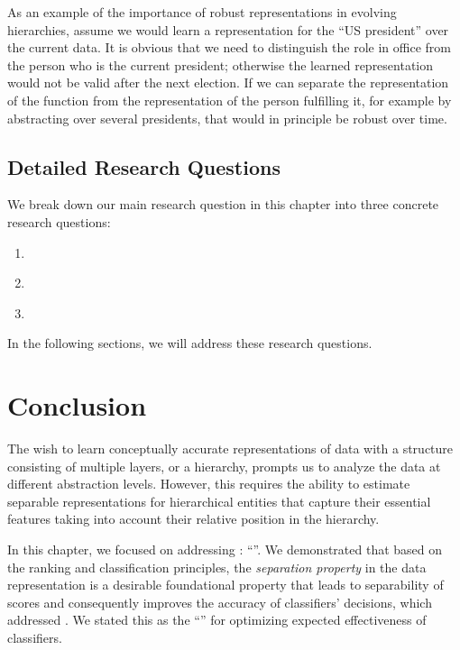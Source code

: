 As an example of the importance of robust representations in evolving hierarchies, assume we would learn a representation for the ``US president'' over the current data. It is obvious that we need to distinguish the role in office from the person who is the current president; otherwise the learned representation would not be valid after the next election.  If we can separate the representation of the function from the representation of the person fulfilling it, for example by abstracting over several presidents, that would in principle be robust over time.

\subsection{Detailed Research Questions}
We break down our main research question in this chapter into three concrete research questions:
\begin{resqbox}
\begin{enumerate}
\item[\textbf{\resqname{c3.1}}] \emph{}
\item[\textbf{\resqname{c3.2}}] \emph{}
\item[\textbf{\resqname{c3.3}}] \emph{}
\end{enumerate}
\end{resqbox}
In the following sections, we will address these research questions.







\section{Conclusion}
The wish to learn conceptually accurate representations of data with a structure consisting of multiple layers, or a hierarchy, prompts us to analyze the data at different abstraction levels.  However, this requires the ability to estimate separable representations for hierarchical entities that capture their essential features taking into account their relative position in the hierarchy. 

In this chapter, we focused on addressing \textbf{}: ``\emph{}''. 
We demonstrated that based on the ranking and classification principles, the \emph{separation property} in the data representation is a desirable foundational property that leads to separability of scores and consequently improves the accuracy of classifiers' decisions, which addressed \textbf{}.  We stated this as the ``\ssp'' for optimizing expected effectiveness of classifiers.

